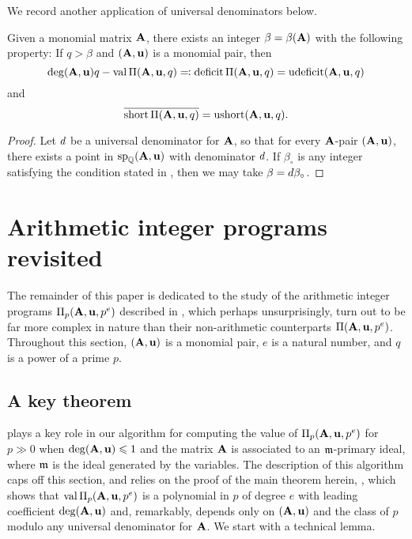 \documentclass{article}
\begin{document}
We record another application of universal denominators below.

\begin{theorem}
\label{uniform uniform value and image: T}
Given a monomial matrix $\mathbf{A}$, there exists an integer $\beta = \beta(\mathbf{A})$ with the following property\textup:
If $q > \beta$ and $(\mathbf{A}, \mathbf{u})$ is a monomial pair, then
\[  \operatorname{deg}(\mathbf{A},\mathbf{u}) q - \operatorname{val} \Pi(\mathbf{A}, \mathbf{u}, q) \eqqcolon \operatorname{deficit} \Pi(\mathbf{A}, \mathbf{u}, q) = \operatorname{udeficit}(\mathbf{A}, \mathbf{u}, q) \]
and
\[  \overline{ \operatorname{short} \Pi(\mathbf{A}, \mathbf{u}, q)} = \operatorname{ushort} (\mathbf{A}, \mathbf{u}, q).\]
\end{theorem}

\begin{proof}
   Let $d$ be a universal denominator for $\mathbf{A}$, so that for every $\mathbf{A}$-pair $(\mathbf{A}, \mathbf{u})$, there exists a point in $\operatorname{sp}_{\mathbb{Q}}(\mathbf{A}, \mathbf{u})$ with denominator $d$.
   If $\beta_{\circ}$  is any integer satisfying the condition stated in , then we may take $\beta = d \beta_{\circ}$.
\end{proof}

\section{Arithmetic integer programs revisited}

The remainder of this paper is dedicated to the study of the arithmetic integer programs $\Pi_p(\mathbf{A}, \mathbf{u}, p^e)$ described in , which perhaps unsurprisingly, turn out to be far more complex in nature than their non-arithmetic counterparts $\Pi(\mathbf{A}, \mathbf{u}, p^e)$.
Throughout this section, $(\mathbf{A},\mathbf{u})$ is a monomial pair, $e$ is a natural number, and $q$ is a power of a prime $p$.

\subsection{A key theorem}
 plays a key role in our algorithm for computing the value of $\Pi_p(\mathbf{A}, \mathbf{u}, p^e)$ for $p \gg 0$ when $\operatorname{deg}(\mathbf{A},\mathbf{u}) \leqslant 1$ and the matrix $\mathbf{A}$ is associated to an $\mathfrak{m}$-primary ideal, where $\mathfrak{m}$ is the ideal generated by the variables.
The description of this algorithm caps off this section, and relies on the proof of the main theorem herein, , which shows that $\operatorname{val} \Pi_p(\mathbf{A}, \mathbf{u}, p^e)$ is a polynomial in $p$ of degree $e$ with leading coefficient $\operatorname{deg}(\mathbf{A},\mathbf{u})$ and, remarkably, depends only on $(\mathbf{A},\mathbf{u})$ and the class of $p$ modulo any universal denominator for $\mathbf{A}$.
We start with a technical lemma.
\end{document}
